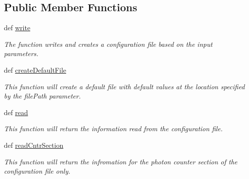 \subsection*{Public Member Functions}
\begin{DoxyCompactItemize}
\item 
def \hyperlink{class_chassis_8git_1_1chassis_config_parser_1_1chassis_config_parser_a05d032cd996fdab14bda3fbbb8ef89e8}{write}
\begin{DoxyCompactList}\small\item\em The function writes and creates a configuration file based on the input parameters. \end{DoxyCompactList}\item 
def \hyperlink{class_chassis_8git_1_1chassis_config_parser_1_1chassis_config_parser_a4b91ec923539b6a8550b3efffd90d53c}{create\-Default\-File}
\begin{DoxyCompactList}\small\item\em This function will create a default file with default values at the location specified by the file\-Path parameter. \end{DoxyCompactList}\item 
def \hyperlink{class_chassis_8git_1_1chassis_config_parser_1_1chassis_config_parser_adf3ea2bef0d00bee4a2a0a01381ecc3d}{read}
\begin{DoxyCompactList}\small\item\em This function will return the information read from the configuration file. \end{DoxyCompactList}\item 
def \hyperlink{class_chassis_8git_1_1chassis_config_parser_1_1chassis_config_parser_aa0b517157b2e9e349aa62190c45dd529}{read\-Cntr\-Section}
\begin{DoxyCompactList}\small\item\em This function will return the infromation for the photon counter section of the configuration file only. \end{DoxyCompactList}\end{DoxyCompactItemize}
